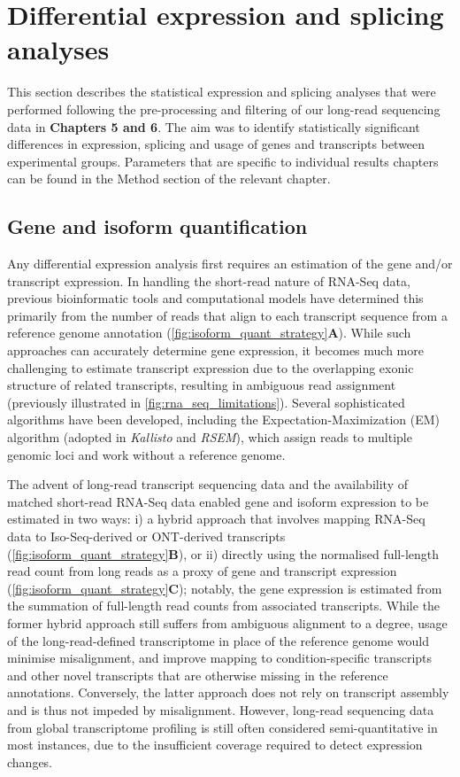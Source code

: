 \section{Differential expression and splicing analyses}

This section describes the statistical expression and splicing analyses that were performed following the pre-processing and filtering of our long-read sequencing data in \textbf{Chapters 5 and 6}. The aim was to identify statistically significant differences in expression, splicing and usage of genes and transcripts between experimental groups. Parameters that are specific to individual results chapters can be found in the Method section of the relevant chapter. 

\subsection{Gene and isoform quantification}\label{sec: gene_isoform_quant_explained}
Any differential expression analysis first requires an estimation of the gene and/or transcript expression. In handling the short-read nature of RNA-Seq data, previous bioinformatic tools and computational models have determined this primarily from the number of reads that align to each transcript sequence from a reference genome annotation\cite{Conesa2016} (\cref{fig:isoform_quant_strategy}\textbf{A}). While such approaches can accurately determine gene expression, it becomes much more challenging to estimate transcript expression due to the overlapping exonic structure of related transcripts, resulting in ambiguous read assignment (previously illustrated in \cref{fig:rna_seq_limitations}). Several sophisticated algorithms have been developed, including the Expectation-Maximization (EM) algorithm (adopted in \textit{Kallisto}\cite{Bray2016} and \textit{RSEM}\cite{Li2011}), which assign reads to multiple genomic loci and work without a reference genome\cite{Conesa2016}. 

The advent of long-read transcript sequencing data and the availability of matched short-read RNA-Seq data enabled gene and isoform expression to be estimated in two ways: i) a hybrid approach that involves mapping RNA-Seq data to Iso-Seq-derived or ONT-derived transcripts (\cref{fig:isoform_quant_strategy}\textbf{B}), or ii) directly using the normalised full-length read count from long reads as a proxy of gene and transcript expression (\cref{fig:isoform_quant_strategy}\textbf{C}); notably, the gene expression is estimated from the summation of full-length read counts from associated transcripts. While the former hybrid approach still suffers from ambiguous alignment to a degree, usage of the long-read-defined transcriptome in place of the reference genome would minimise misalignment, and improve mapping to condition-specific transcripts and other novel transcripts that are otherwise missing in the reference annotations\cite{Au2013}. Conversely, the latter approach does not rely on transcript assembly and is thus not impeded by misalignment. However, long-read sequencing data from global transcriptome profiling is still often considered semi-quantitative in most instances, due to the insufficient coverage required to detect expression changes.


